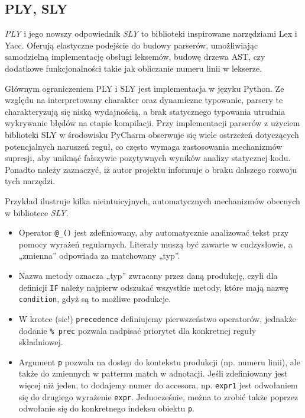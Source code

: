 \subsection{PLY, SLY}
\label{subsec:ply-sly}

\textit{PLY}\cite{ply} i jego nowszy odpowiednik \textit{SLY}\cite{sly} to biblioteki inspirowane narzędziami Lex i Yacc.
Oferują elastyczne podejście do budowy parserów, umożliwiając samodzielną implementację obsługi leksemów, budowę drzewa AST, czy dodatkowe funkcjonalności takie jak obliczanie numeru linii w lekserze.

Głównym ograniczeniem PLY i SLY jest implementacja w języku Python.
Ze względu na interpretowany charakter oraz dynamiczne typowanie, parsery te charakteryzują się niską wydajnością, a brak statycznego typowania utrudnia wykrywanie błędów na etapie kompilacji.
Przy implementacji parserów z użyciem biblioteki SLY w środowisku PyCharm obserwuje się wiele ostrzeżeń dotyczących potencjalnych naruszeń reguł, co często wymaga zastosowania mechanizmów supresji, aby uniknąć fałszywie pozytywnych wyników analizy statycznej kodu.
Ponadto należy zaznaczyć, iż autor projektu informuje o braku dalszego rozwoju tych narzędzi\cite{sly-github}.

Przykład ilustruje kilka nieintuicyjnych, automatycznych mechanizmów obecnych w bibliotece \textit{SLY}.
\begin{itemize}
    \item Operator \verb|@_()| jest zdefiniowany, aby automatycznie analizować tekst przy pomocy wyrażeń regularnych.
    Literały muszą być zawarte w cudzysłowie, a „zmienna” odpowiada za matchowany „typ”.
    \item Nazwa metody oznacza „typ” zwracany przez daną produkcję, czyli dla definicji \verb|IF| należy najpierw odszukać wszystkie metody, które mają nazwę \verb|condition|, gdyż są to możliwe produkcje.
    \item W krotce (sic!) \verb|precedence| definiujemy pierwszeństwo operatorów, jednakże dodanie \verb|% prec| pozwala nadpisać priorytet dla konkretnej reguły składniowej.
    \item  Argument \verb|p| pozwala na dostęp do kontekstu produkcji (np. numeru linii), ale także do zmiennych w patternu match w adnotacji.
    Jeśli zdefiniowany jest więcej niż jeden, to dodajemy numer do accesora, np. \verb|expr1| jest odwołaniem się do drugiego wyrażenie \verb|expr|.
    Jednocześnie, można to zrobić także poprzez odwołanie się do konkretnego indeksu obiektu \verb|p|.
\end{itemize}

